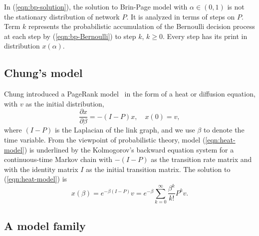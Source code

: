 \documentclass[conference]{IEEEtran}
\begin{document}
In (\ref{eqn:bp-solution}), the solution to Brin-Page model with
$\alpha \in (0,1)$ is not the stationary distribution of network $P$. It
is analyzed in terms of steps on $P$. Term $k$ represents the probabilistic
accumulation of the Bernoulli decision process at each step by
(\ref{eqn:bp-Bernoulli}) to step $k$, $k\geq 0$.  Every step has its
print in distribution $x(\alpha)$.





%


\subsection{Chung's model} 
\label{subsec:Chung-model}


Chung introduced a PageRank model~\cite{chung2007heat} in the form of a
heat or diffusion equation, with $v$ as the initial distribution,
% 
\begin{equation}
\label{eqn:heat-model}
  \frac{\partial x}{\partial \beta} = - (I - P)x, \quad x(0) = v,
\end{equation}
%
where $( I - P ) $ is the Laplacian of the link graph, and we use
$\beta$ to denote the time variable.
%
From the viewpoint of probabilistic theory, model (\ref{eqn:heat-model})
is underlined by the Kolmogorov's backward equation system for a continuous-time
Markov chain with $-(I-P)$ as the transition rate matrix and with the
identity matrix $I$ as the initial transition matrix.
% 
The solution to (\ref{eqn:heat-model}) is 
%
\begin{equation}
\label{eqn:heat-solution}
x(\beta) 
= e^{-\beta(I-P)}v 
= e^{-\beta} \sum_{k = 0} ^ {\infty} \frac{\beta^k}{k!} P^k v. 
\end{equation}
%




\subsection{A model family}
\label{subsec:model-family}
%
\end{document}
